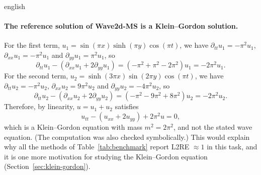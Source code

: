 \begin{hyphenrules}{english}
\paragraph{The reference solution of Wave2d-MS is a Klein--Gordon solution.}
For the first term, $u_1=\sin(\pi x)\sinh(\pi y)\cos(\pi t)$, we have $\partial_{tt}u_1=-\pi^2u_1$,
$\partial_{xx}u_1=-\pi^2u_1$ and $\partial_{yy}u_1=\pi^2u_1$, so
\[
  \partial_{tt}u_1-(\partial_{xx}u_1+2\partial_{yy}u_1)=(-\pi^2+\pi^2-2\pi^2)u_1=-2\pi^2u_1.
\]
For the second term, $u_2=\sinh(3\pi x)\sin(2\pi y)\cos(\pi t)$, we have $\partial_{tt}u_2=-\pi^2u_2$,
$\partial_{xx}u_2=9\pi^2u_2$ and $\partial_{yy}u_2=-4\pi^2u_2$, so
\[
  \partial_{tt}u_2-(\partial_{xx}u_2+2\partial_{yy}u_2)=(-\pi^2-9\pi^2+8\pi^2)u_2=-2\pi^2u_2.
\]
Therefore, by linearity, $u=u_1+u_2$ satisfies
\begin{equation}
  u_{tt}-(u_{xx}+2u_{yy})+2\pi^2u=0,
  \label{eq:wave2dms-kg}
\end{equation}
which is a Klein--Gordon equation with mass $m^2=2\pi^2$, and not the stated wave equation. (The
computation was also checked symbolically.) This would explain why all the methods of
Table~\ref{tab:benchmark} report L2RE $\approx1$ in this task, and it is one more motivation for studying the
Klein--Gordon equation (Section~\ref{sec:klein-gordon}).

\end{hyphenrules}
